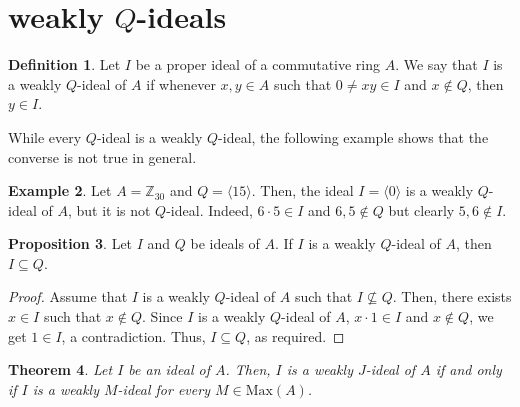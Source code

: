\documentclass[preprint,review,10pt]{amsart}
\newtheorem{theorem}{Theorem}[section]
\theoremstyle{definition}
\newtheorem{definition}[theorem]{Definition}
\newtheorem{example}[theorem]{Example}
\newtheorem{proposition}[theorem]{Proposition}
\theoremstyle{remark}
\numberwithin{equation}{section}
\begin{document}
 








\section{weakly $Q$-ideals}
\begin{definition}
Let $I$ be a proper ideal of a commutative ring $A$. We say that $I$ is a weakly $Q$-ideal of $A$ if whenever $x,y \in A$ such that $0 \neq xy \in I$ and $x \notin Q$, then $y \in I$.
\end{definition}
While every $Q$-ideal is a weakly $Q$-ideal, the following example shows that the converse is not true in general.
\begin{example}
Let $A=\mathbb{Z}_{30}$ and $Q=\langle 15 \rangle$. Then, the ideal $I=\langle 0 \rangle$ is a weakly $Q$-ideal of $A$, but it is not $Q$-ideal. Indeed, $6 \cdot 5 \in I$ and $6,5 \notin Q$ but clearly $5,6 \notin I$.
\end{example}
\begin{proposition} \label{1}
Let $I$ and $Q$ be  ideals of $A$. If $I$ is a weakly $Q$-ideal of $A$, then $I \subseteq Q$.
\end{proposition}
\begin{proof}
Assume that $I$ is a weakly $Q$-ideal of $A$ such that  $I \nsubseteq Q$. Then, there exists $x \in I$ such that $x \notin Q$. Since $I$ is a weakly $Q$-ideal of $A$, $x \cdot 1 \in I$ and $x \notin Q$, we get $1 \in I$, a contradiction. Thus, $I \subseteq Q$, as required.
\end{proof}
\begin{theorem}\label{2}
Let $I$ be an ideal of $A$. Then, $I$ is a weakly $J$-ideal of $A$ if and only if $I$ is a weakly $M$-ideal for every  $M \in \text{Max}(A)$.
\end{theorem}
\end{document}
